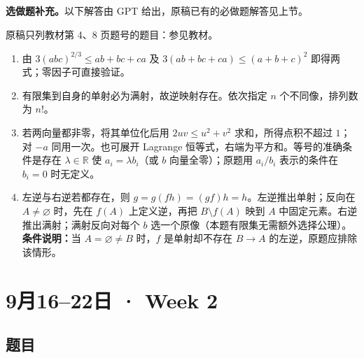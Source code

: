 \documentclass[UTF8,11pt, a4paper, oneside, fontset=none]{ctexbook}
\begin{document}
\noindent\textbf{选做题补充。}以下解答由 GPT 给出，原稿已有的必做题解答见上节。
\par\noindent 原稿只列教材第 4、8 页题号的题目：参见教材。
\begin{enumerate}
\item 由 $3(abc)^{2/3}\le ab+bc+ca$ 及 $3(ab+bc+ca)\le(a+b+c)^2$ 即得两式；零因子可直接验证。
\item 有限集到自身的单射必为满射，故逆映射存在。依次指定 $n$ 个不同像，排列数为 $n!$。
\item 若两向量都非零，将其单位化后用 $2uv\le u^2+v^2$ 求和，所得点积不超过 $1$；对 $-a$ 同用一次。也可展开 Lagrange 恒等式，右端为平方和。等号的准确条件是存在 $\lambda\in\mathbb R$ 使 $a_i=\lambda b_i$（或 $b$ 向量全零）；原题用 $a_i/b_i$ 表示的条件在 $b_i=0$ 时无定义。
\item 左逆与右逆若都存在，则 $g=g(fh)=(gf)h=h$。左逆推出单射；反向在 $A\ne\varnothing$ 时，先在 $f(A)$ 上定义逆，再把 $B\setminus f(A)$ 映到 $A$ 中固定元素。右逆推出满射；满射反向对每个 $b$ 选一个原像（本题有限集无需额外选择公理）。\textbf{条件说明：}当 $A=\varnothing\ne B$ 时，$f$ 是单射却不存在 $B\to A$ 的左逆，原题应排除该情形。
\end{enumerate}

\clearpage

\section{9月16--22日 · Week 2}

\subsection*{题目}
\end{document}
